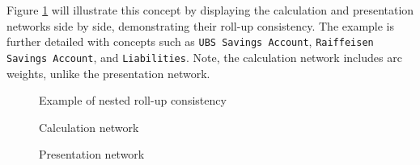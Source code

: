 Figure \ref{fig:example_roll_up_consistency} will illustrate this concept by displaying the calculation and presentation networks side by side,  
demonstrating their roll-up consistency.  
The example is further detailed with concepts such as \texttt{UBS Savings Account}, \texttt{Raiffeisen Savings Account}, and \texttt{Liabilities}.  
Note, the calculation network includes arc weights, unlike the presentation network.

\begin{figure}[H]
    \caption{Example of nested roll-up consistency}
    \label{fig:example_roll_up_consistency}
    \begin{minipage}{0.8\textwidth}
        \caption{Calculation network}
    \end{minipage}
    \begin{minipage}{0.8\textwidth}
        \caption{Presentation network}
    \end{minipage}
\end{figure}



